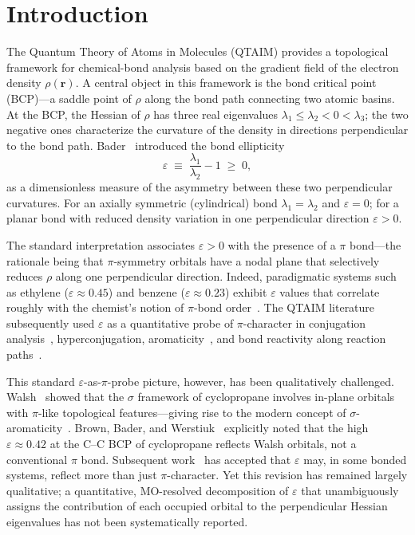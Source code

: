 \documentclass[twoside,natbib]{svjour3}
\newcommand{\eps}{\varepsilon}
\begin{document}
\section{Introduction}
\label{sec:intro}

The Quantum Theory of Atoms in Molecules (QTAIM)
\citep{Bader1990,Popelier2000} provides a topological framework for
chemical-bond analysis based on the gradient field of the electron
density $\rho(\mathbf{r})$. A central object in this framework is the
bond critical point (BCP)---a saddle point of $\rho$ along the bond
path connecting two atomic basins. At the BCP, the Hessian of $\rho$
has three real eigenvalues $\lambda_1 \le \lambda_2 < 0 < \lambda_3$;
the two negative ones characterize the curvature of the density in
directions perpendicular to the bond path. Bader~\citep{Bader1983}
introduced the bond ellipticity
\begin{equation}
\eps \;\equiv\; \frac{\lambda_1}{\lambda_2} - 1 \;\ge\; 0,
\label{eq:eps_def}
\end{equation}
as a dimensionless measure of the asymmetry between these two
perpendicular curvatures. For an axially symmetric (cylindrical) bond
$\lambda_1 = \lambda_2$ and $\eps = 0$; for a planar bond with reduced
density variation in one perpendicular direction $\eps > 0$.

The standard interpretation associates $\eps > 0$ with the presence of
a $\pi$ bond---the rationale being that $\pi$-symmetry orbitals have a
nodal plane that selectively reduces $\rho$ along one perpendicular
direction. Indeed, paradigmatic systems such as ethylene
($\eps \approx 0.45$) and benzene ($\eps \approx 0.23$) exhibit
$\eps$ values that correlate roughly with the chemist's notion of
$\pi$-bond order~\citep{Bader1983,Cremer1984,Popelier2000}. The
QTAIM literature subsequently used $\eps$ as a quantitative probe of
$\pi$-character in conjugation analysis~\citep{Cremer1988},
hyperconjugation, aromaticity~\citep{Matta2003}, and bond reactivity
along reaction paths~\citep{Mitra2012}.

This standard $\eps$-as-$\pi$-probe picture, however, has been
qualitatively challenged. Walsh~\citep{Walsh1947} showed that the
$\sigma$ framework of cyclopropane involves in-plane orbitals with
$\pi$-like topological features---giving rise to the modern concept
of $\sigma$-aromaticity~\citep{Cremer1988,Dewar1984}. Brown, Bader,
and Werstiuk~\citep{Brown2009} explicitly noted that the high
$\eps \approx 0.42$ at the C--C BCP of cyclopropane reflects Walsh
orbitals, not a conventional $\pi$ bond. Subsequent
work~\citep{Gao2009,Suthar2023,Popelier2018} has accepted that
$\eps$ may, in some bonded systems, reflect more than just
$\pi$-character. Yet this revision has remained largely
qualitative; a quantitative, MO-resolved decomposition of $\eps$ that
unambiguously assigns the contribution of each occupied orbital to
the perpendicular Hessian eigenvalues has not been systematically
reported.
\end{document}
